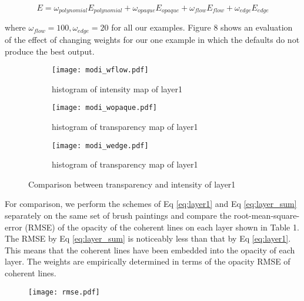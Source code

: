\begin{equation}
E=\omega_{polynomial}E_{polynomial}+\omega_{opaque}E_{opaque}+\omega_{flow}E_{flow}+\omega_{edge}E_{edge}
\label{eq:layer_sum}
\end{equation} 

where $\omega_{flow}=100, \omega_{edge}=20 $ for all our examples. Figure 8 shows an evaluation of the effect of changing weights for our one example in which the defaults do not produce
the best output.
 
\begin{figure}[tb]
	\centering

	\begin{subfigure}[b]{0.7\textwidth}
		\texttt{[image: modi\_wflow.pdf]}
		\caption{histogram of intensity map of layer1}
	\end{subfigure}
%
	\begin{subfigure}[b]{0.7\textwidth}
		\texttt{[image: modi\_wopaque.pdf]}
		\caption{histogram of transparency map of layer1}
	\end{subfigure}
	
	\begin{subfigure}[b]{0.7\textwidth}
		\texttt{[image: modi\_wedge.pdf]}
		\caption{histogram of transparency map of layer1}
	\end{subfigure}
	
	\caption{Comparison between transparency and intensity of layer1}
	\label{modi_para}
\end{figure}













For comparison, we perform the schemes of Eq \ref{eq:layer1} and Eq \ref{eq:layer_sum} separately on the same set of brush paintings and compare the root-mean-square-error (RMSE) of the opacity of the coherent lines on each layer shown in Table 1. The RMSE by Eq \ref{eq:layer_sum} is noticeably less than that by Eq \ref{eq:layer1}. This means that the coherent lines have been embedded into the opacity of each layer. The weights are empirically determined in terms of the opacity RMSE of coherent lines.

\begin{figure}
	\centering
	\texttt{[image: rmse.pdf]}

\end{figure}

















